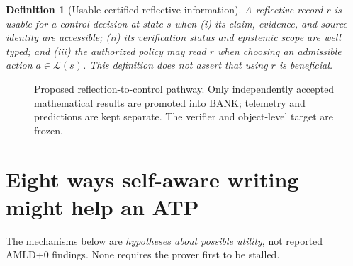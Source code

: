 \documentclass[11pt,letterpaper]{article}
\newtheorem{definition}{Definition}[section]
\begin{document}
\begin{definition}[Usable certified reflective information]
A reflective record $r$ is \emph{usable for a control decision} at state $s$ when (i) its claim, evidence, and source identity are accessible; (ii) its verification status and epistemic scope are well typed; and (iii) the authorized policy may read $r$ when choosing an admissible action $a\in\mathcal L(s)$. This definition does not assert that using $r$ is beneficial.
\end{definition}

\begin{figure}[htbp]
\centering
{}
\caption{Proposed reflection-to-control pathway. Only independently accepted mathematical results are promoted into BANK; telemetry and predictions are kept separate. The verifier and object-level target are frozen.}
\end{figure}

\section{Eight ways self-aware writing might help an ATP}
The mechanisms below are \emph{hypotheses about possible utility}, not reported AMLD+0 findings. None requires the prover first to be stalled.
\end{document}
